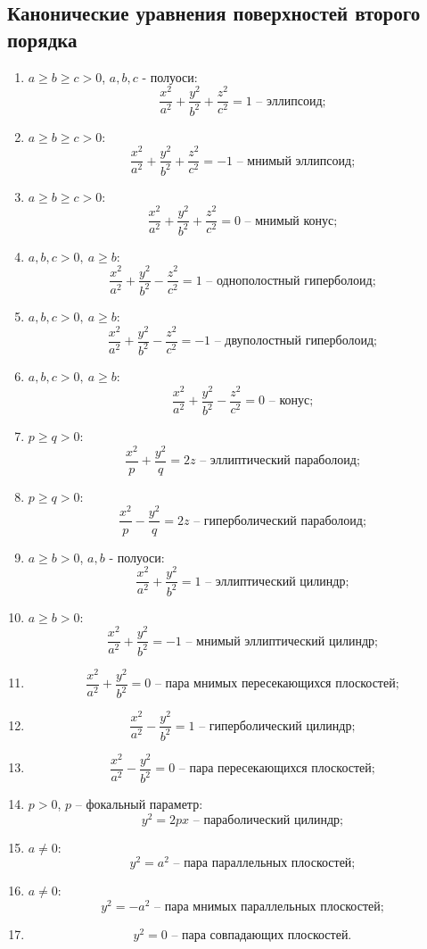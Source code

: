 \documentclass[a4paper, 12pt]{article}
\theoremstyle{definition}
\begin{document}
\subsection{Канонические уравнения поверхностей второго порядка}
\begin{enumerate}
    \item $a \geqslant b \geqslant c > 0$, $a,b,c$ - полуоси:
    \[\frac{x^2}{a^2} + \frac{y^2}{b^2} + \frac{z^2}{c^2} = 1 \text{ – эллипсоид;}\]
    \item $a \geqslant b \geqslant c > 0$:
    \[\frac{x^2}{a^2} + \frac{y^2}{b^2} + \frac{z^2}{c^2} = -1 \text{ – мнимый эллипсоид;}\]
    \item $a \geqslant b \geqslant c > 0$:
    \[\frac{x^2}{a^2} + \frac{y^2}{b^2} + \frac{z^2}{c^2} = 0 \text{ – мнимый конус;}\]
    \item $a, b, c > 0, \ a \geqslant b$:
    \[\frac{x^2}{a^2} + \frac{y^2}{b^2} - \frac{z^2}{c^2} = 1 \text{ – однополостный гиперболоид;}\]
    \item $a, b, c > 0, \ a \geqslant b$:
    \[\frac{x^2}{a^2} + \frac{y^2}{b^2} - \frac{z^2}{c^2} = -1 \text{ – двуполостный гиперболоид;}\]
    \item $a, b, c > 0, \ a \geqslant b$:
    \[\frac{x^2}{a^2} + \frac{y^2}{b^2} - \frac{z^2}{c^2} = 0 \text{ – конус;}\]
    \item $p \geqslant q > 0$:
    \[\frac{x^2}{p} + \frac{y^2}{q} = 2z \text{ – эллиптический параболоид;}\]
    \item $p \geqslant q > 0$:
    \[\frac{x^2}{p} - \frac{y^2}{q} = 2z \text{ – гиперболический параболоид;}\]
    \item $a \geqslant b > 0$, $a,b$ - полуоси:
    \[\frac{x^2}{a^2} + \frac{y^2}{b^2} = 1 \text{ – эллиптический цилиндр;}\]
    \item $a \geqslant b > 0$:
    \[\frac{x^2}{a^2} + \frac{y^2}{b^2} = -1 \text{ – мнимый эллиптический цилиндр;}\]
    \item \[\frac{x^2}{a^2} + \frac{y^2}{b^2} = 0 \text{ – пара мнимых пересекающихся плоскостей;}\]
    \item \[\frac{x^2}{a^2} - \frac{y^2}{b^2} = 1 \text{ – гиперболический цилиндр;}\]
    \item \[\frac{x^2}{a^2} - \frac{y^2}{b^2} = 0 \text{ – пара пересекающихся плоскостей;}\]
    \item $p > 0$, $p$ – фокальный параметр:
    \[y^2 = 2px \text{ – параболический цилиндр;}\]
    \item $a \neq 0$:
    \[y^2 = a^2 \text{ – пара параллельных плоскостей;}\]
    \item $a \neq 0$:
    \[y^2 = -a^2 \text{ – пара мнимых параллельных плоскостей;}\]
    \item \[y^2 = 0 \text{ – пара совпадающих плоскостей.}\]
\end{enumerate}
\end{document}
